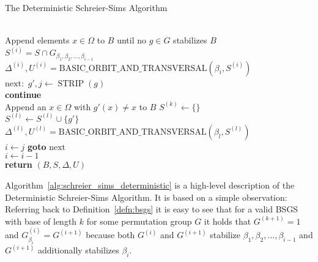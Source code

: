 \begin{algorithm}
  \caption{The Deterministic Schreier-Sims Algorithm}
  \label{alg:schreier_sims_deterministic}
  \begin{algorithmic}[1]
    \\
    \State Append elements $x \in \Omega$ to $B$ until no $g \in G$ stabilizes $B$
    \\
      \State $S^{(i)} = S \cap G_{\beta_1, \beta_2, \dots, \beta_{i-1}}$
      \State $\Delta^{(i)}, U^{(i)} = \text{BASIC\_ORBIT\_AND\_TRANSVERSAL}(
        \beta_i, S^{(i)})$
    \EndFor
    \\
\State \unskip $\mathrm{next:}$
        \State $g', j \gets \operatorname{STRIP}(g)$
        \\
          \State \textbf{continue}
        \EndIf
        \\
          \State Append an $x \in \Omega$ with $g'(x) \ne x$ to $B$
          \State $S^{(k)} \gets \{\}$
        \EndIf
        \\
          \State $S^{(l)} \gets S^{(l)} \cup \{g'\}$
          \State $\Delta^{(l)}, U^{(l)} = \text{BASIC\_ORBIT\_AND\_TRANSVERSAL}(
            \beta_l, S^{(l)})$
        \EndFor
        \\
        \State $i \gets j$
        \State \textbf{goto} $\mathrm{next}$
      \EndFor
      \\
      \State $i \gets i - 1$
    \EndWhile
    \\
    \State \textbf{return} $(B,S,\Delta,U)$
  \EndProcedure
  \end{algorithmic}
\end{algorithm}

Algorithm~\ref{alg:schreier_sims_deterministic} is a high-level
description of the Deterministic Schreier-Sims Algorithm. It is based on a
simple observation: Referring back to Definition~\ref{defn:bsgs} it is easy to
see that for a valid BSGS with base of length $k$ for some permutation group
$G$ it holds that $G^{(k+1)} = 1$ and $G^{(i)}_{\beta_i} = G^{(i+1)}$ because
both $G^{(i)}$ and $G^{(i+1)}$ stabilize $\beta_1, \beta_2, \dots, \beta_{i-1}$
and $G^{(i+1)}$ additionally stabilizes $\beta_i$.

